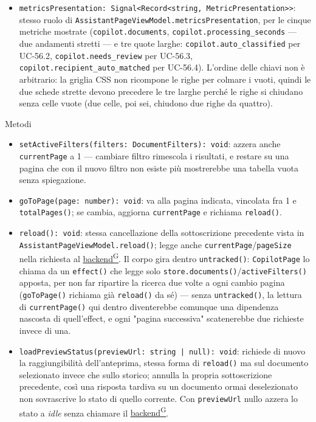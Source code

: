 \documentclass[a4paper,12pt]{article}
\providecommand{\glslink}[2]{\href{https://alittlebyte-19.github.io/Documentazione/glossario.html\#gls-#1}{\underline{#2}\textsuperscript{\scriptsize G}}}
\begin{document}
\begin{sloppypar}
\begin{itemize}
    \item \texttt{metricsPresentation: Signal<Record<string, MetricPresentation>>}: stesso ruolo di \texttt{AssistantPageViewModel.metricsPresentation}, per le cinque metriche mostrate (\texttt{copilot.documents}, \texttt{copilot.processing\_seconds} — due andamenti stretti — e tre quote larghe: \texttt{copilot.auto\_classified} per UC-56.2, \texttt{copilot.needs\_review} per UC-56.3, \texttt{copilot.recipient\_auto\_matched} per UC-56.4). L'ordine delle chiavi non è arbitrario: la griglia CSS non ricompone le righe per colmare i vuoti, quindi le due schede strette devono precedere le tre larghe perché le righe si chiudano senza celle vuote (due celle, poi sei, chiudono due righe da quattro).
\end{itemize}

Metodi
\begin{itemize}\raggedright
    \item \texttt{setActiveFilters(filters: DocumentFilters): void}: azzera anche \texttt{currentPage} a 1 — cambiare filtro rimescola i risultati, e restare su una pagina che con il nuovo filtro non esiste più mostrerebbe una tabella vuota senza spiegazione.
    \item \texttt{goToPage(page: number): void}: va alla pagina indicata, vincolata fra 1 e \texttt{totalPages()}; se cambia, aggiorna \texttt{currentPage} e richiama \texttt{reload()}.
    \item \texttt{reload(): void}: stessa cancellazione della sottoscrizione precedente vista in \texttt{AssistantPageViewModel.reload()}; legge anche \texttt{currentPage}/\texttt{pageSize} nella richiesta al \glslink{backend}{backend}. Il corpo gira dentro \texttt{untracked()}: \texttt{CopilotPage} lo chiama da un \texttt{effect()} che legge solo \texttt{store.documents()}/\texttt{activeFilters()} apposta, per non far ripartire la ricerca due volte a ogni cambio pagina (\texttt{goToPage()} richiama già \texttt{reload()} da sé) — senza \texttt{untracked()}, la lettura di \texttt{currentPage()} qui dentro diventerebbe comunque una dipendenza nascosta di quell'effect, e ogni "pagina successiva" scatenerebbe due richieste invece di una.
    \item \texttt{loadPreviewStatus(previewUrl: string | null): void}: richiede di nuovo la raggiungibilità dell'anteprima, stessa forma di \texttt{reload()} ma sul documento selezionato invece che sullo storico; annulla la propria sottoscrizione precedente, così una risposta tardiva su un documento ormai deselezionato non sovrascrive lo stato di quello corrente. Con \texttt{previewUrl} nullo azzera lo stato a \textit{idle} senza chiamare il \glslink{backend}{backend}.

\end{itemize}
\end{sloppypar}
\end{document}
